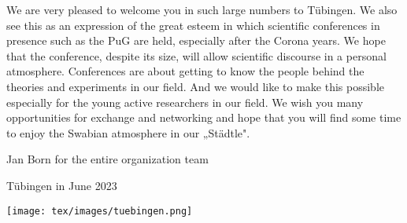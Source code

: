 We are very pleased to welcome you in such large numbers to Tübingen. We also see this as an expression of the great esteem in which scientific conferences in presence such as the PuG are held, especially after the Corona years. We hope that the conference, despite its size, will allow scientific discourse in a personal atmosphere. Conferences are about getting to know the people behind the theories and experiments in our field. And we would like to make this possible especially for the young active researchers in our field. We wish you many opportunities for exchange and networking and hope that you will find some time to enjoy the Swabian atmosphere in our „Städtle".

Jan Born for the entire organization team

Tübingen in June 2023

\vspace*{2cm}

\begin{center}
	\texttt{[image: tex/images/tuebingen.png]}
\end{center}

\newpage